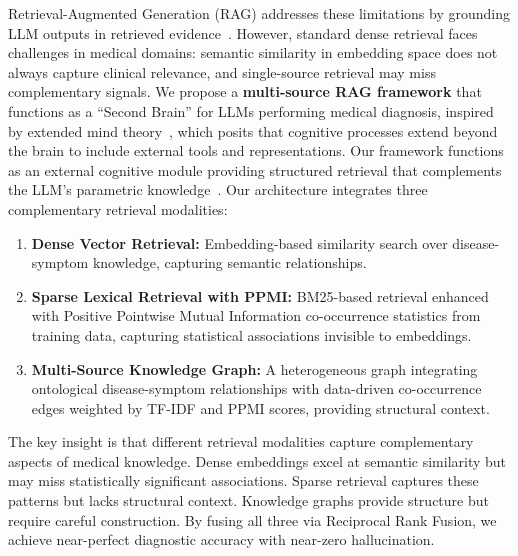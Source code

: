 \documentclass[runningheads]{llncs}
\begin{document}
Retrieval-Augmented Generation (RAG) addresses these limitations by grounding LLM outputs in retrieved evidence~\cite{lewis2020retrieval,gao2023retrieval}. However, standard dense retrieval faces challenges in medical domains: semantic similarity in embedding space does not always capture clinical relevance, and single-source retrieval may miss complementary signals. We propose a \textbf{multi-source RAG framework} that functions as a ``Second Brain'' for LLMs performing medical diagnosis, inspired by extended mind theory~\cite{clark1998extended}, which posits that cognitive processes extend beyond the brain to include external tools and representations. Our framework functions as an external cognitive module providing structured retrieval that complements the LLM's parametric knowledge~\cite{hutchins1995cognition}. Our architecture integrates three complementary retrieval modalities:

\begin{enumerate}
    \item \textbf{Dense Vector Retrieval:} Embedding-based similarity search over disease-symptom knowledge, capturing semantic relationships.
    \item \textbf{Sparse Lexical Retrieval with PPMI:} BM25-based retrieval enhanced with Positive Pointwise Mutual Information co-occurrence statistics from training data, capturing statistical associations invisible to embeddings.
    \item \textbf{Multi-Source Knowledge Graph:} A heterogeneous graph integrating ontological disease-symptom relationships with data-driven co-occurrence edges weighted by TF-IDF and PPMI scores, providing structural context.
\end{enumerate}

The key insight is that different retrieval modalities capture complementary aspects of medical knowledge. Dense embeddings excel at semantic similarity but may miss statistically significant associations. Sparse retrieval captures these patterns but lacks structural context. Knowledge graphs provide structure but require careful construction. By fusing all three via Reciprocal Rank Fusion, we achieve near-perfect diagnostic accuracy with near-zero hallucination.
\end{document}
